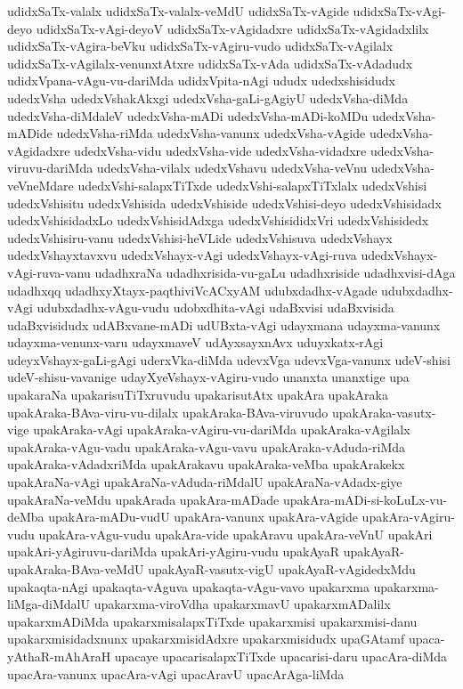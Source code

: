 {udidxSaTx-valalx
udidxSaTx-valalx-veMdU
udidxSaTx-vAgide
udidxSaTx-vAgi-deyo
udidxSaTx-vAgi-deyoV
udidxSaTx-vAgidadxre
udidxSaTx-vAgidadxlilx
udidxSaTx-vAgira-beVku
udidxSaTx-vAgiru-vudo
udidxSaTx-vAgilalx
udidxSaTx-vAgilalx-venunxtAtxre
udidxSaTx-vAda
udidxSaTx-vAdadudx
udidxVpana-vAgu-vu-dariMda
udidxVpita-nAgi
ududx
udedxshisidudx
udedxVsha
udedxVshakAkxgi
udedxVsha-gaLi-gAgiyU
udedxVsha-diMda
udedxVsha-diMdaleV
udedxVsha-mADi
udedxVsha-mADi-koMDu
udedxVsha-mADide
udedxVsha-riMda
udedxVsha-vanunx
udedxVsha-vAgide
udedxVsha-vAgidadxre
udedxVsha-vidu
udedxVsha-vide
udedxVsha-vidadxre
udedxVsha-viruvu-dariMda
udedxVsha-vilalx
udedxVshavu
udedxVsha-veVnu
udedxVsha-veVneMdare
udedxVshi-salapxTiTxde
udedxVshi-salapxTiTxlalx
udedxVshisi
udedxVshisitu
udedxVshisida
udedxVshiside
udedxVshisi-deyo
udedxVshisidadx
udedxVshisidadxLo
udedxVshisidAdxga
udedxVshisididxVri
udedxVshisidedx
udedxVshisiru-vanu
udedxVshisi-heVLide
udedxVshisuva
udedxVshayx
udedxVshayxtavxvu
udedxVshayx-vAgi
udedxVshayx-vAgi-ruva
udedxVshayx-vAgi-ruva-vanu
udadhxraNa
udadhxrisida-vu-gaLu
udadhxriside
udadhxvisi-dAga
udadhxqq
udadhxyXtayx-paqthiviVcACxyAM
udubxdadhx-vAgade
udubxdadhx-vAgi
udubxdadhx-vAgu-vudu
udobxdhita-vAgi
udaBxvisi
udaBxvisida
udaBxvisidudx
udABxvane-mADi
udUBxta-vAgi
udayxmana
udayxma-vanunx
udayxma-venunx-varu
udayxmaveV
udAyxsayxnAvx
uduyxkatx-rAgi
udeyxVshayx-gaLi-gAgi
uderxVka-diMda
udevxVga
udevxVga-vanunx
udeV-shisi
udeV-shisu-vavanige
udayXyeVshayx-vAgiru-vudo
unanxta
unanxtige
upa
upakaraNa
upakarisuTiTxruvudu
upakarisutAtx
upakAra
upakAraka
upakAraka-BAva-viru-vu-dilalx
upakAraka-BAva-viruvudo
upakAraka-vasutx-vige
upakAraka-vAgi
upakAraka-vAgiru-vu-dariMda
upakAraka-vAgilalx
upakAraka-vAgu-vadu
upakAraka-vAgu-vavu
upakAraka-vAduda-riMda
upakAraka-vAdadxriMda
upakArakavu
upakAraka-veMba
upakArakekx
upakAraNa-vAgi
upakAraNa-vAduda-riMdalU
upakAraNa-vAdadx-giye
upakAraNa-veMdu
upakArada
upakAra-mADade
upakAra-mADi-si-koLuLx-vu-deMba
upakAra-mADu-vudU
upakAra-vanunx
upakAra-vAgide
upakAra-vAgiru-vudu
upakAra-vAgu-vudu
upakAra-vide
upakAravu
upakAra-veVnU
upakAri
upakAri-yAgiruvu-dariMda
upakAri-yAgiru-vudu
upakAyaR
upakAyaR-upakAraka-BAva-veMdU
upakAyaR-vasutx-vigU
upakAyaR-vAgidedxMdu
upakaqta-nAgi
upakaqta-vAguva
upakaqta-vAgu-vavo
upakarxma
upakarxma-liMga-diMdalU
upakarxma-viroVdha
upakarxmavU
upakarxmADalilx
upakarxmADiMda
upakarxmisalapxTiTxde
upakarxmisi
upakarxmisi-danu
upakarxmisidadxnunx
upakarxmisidAdxre
upakarxmisidudx
upaGAtamf
upaca-yAthaR-mAhAraH
upacaye
upacarisalapxTiTxde
upacarisi-daru
upacAra-diMda
upacAra-vanunx
upacAra-vAgi
upacAravU
upacArAga-liMda
}
